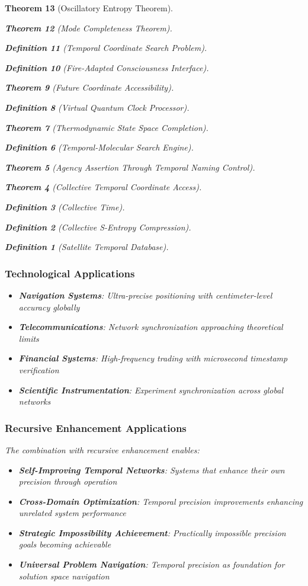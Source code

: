 \documentclass[12pt,a4paper]{article}
\newtheorem{theorem}{Theorem}[section]
\newtheorem{definition}[theorem]{Definition}
\begin{document}
\begin{theorem}[Oscillatory Entropy Theorem]
\begin{theorem}[Mode Completeness Theorem]
\begin{enumerate}
\begin{definition}[Temporal Coordinate Search Problem]
\begin{algorithm}
\begin{definition}[Fire-Adapted Consciousness Interface]
\begin{theorem}[Future Coordinate Accessibility]
\begin{definition}[Virtual Quantum Clock Processor]
\begin{itemize}
\begin{itemize}
\begin{theorem}[Thermodynamic State Space Completion]
\begin{definition}[Temporal-Molecular Search Engine]
\begin{theorem}[Agency Assertion Through Temporal Naming Control]
\begin{remark}
\begin{theorem}[Collective Temporal Coordinate Access]
\begin{definition}[Collective Time]
\begin{definition}[Collective S-Entropy Compression]
\begin{definition}[Satellite Temporal Database]
\begin{algorithm}
\begin{table}[h]
{{\subsubsection{Technological Applications}

\begin{itemize}
\item \textbf{Navigation Systems}: Ultra-precise positioning with centimeter-level accuracy globally
\item \textbf{Telecommunications}: Network synchronization approaching theoretical limits
\item \textbf{Financial Systems}: High-frequency trading with microsecond timestamp verification
\item \textbf{Scientific Instrumentation}: Experiment synchronization across global networks
\end{itemize}

\subsubsection{Recursive Enhancement Applications}

The combination with recursive enhancement enables:

\begin{itemize}
\item \textbf{Self-Improving Temporal Networks}: Systems that enhance their own precision through operation
\item \textbf{Cross-Domain Optimization}: Temporal precision improvements enhancing unrelated system performance
\item \textbf{Strategic Impossibility Achievement}: Practically impossible precision goals becoming achievable
\item \textbf{Universal Problem Navigation}: Temporal precision as foundation for solution space navigation
\end{itemize}

}}
\end{table}
\end{algorithm}
\end{definition}
\end{definition}
\end{definition}
\end{theorem}
\end{remark}
\end{theorem}
\end{definition}
\end{theorem}
\end{itemize}
\end{itemize}
\end{definition}
\end{theorem}
\end{definition}
\end{algorithm}
\end{definition}
\end{enumerate}
\end{theorem}
\end{theorem}
\end{document}
